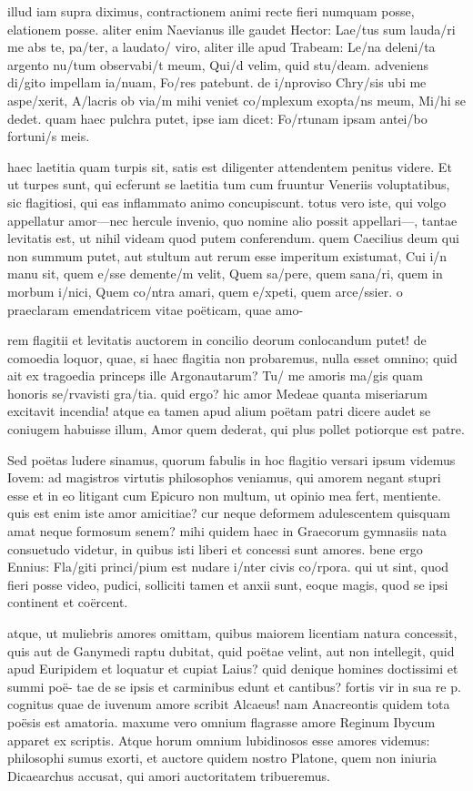  illud iam supra diximus, contractionem animi recte fieri numquam posse, elationem posse. aliter enim Naevianus ille gaudet Hector: Lae/tus sum lauda/ri me abs te, pa/ter, a laudato/ viro, aliter ille apud Trabeam: Le/na deleni/ta argento nu/tum observabi/t meum, Qui/d velim, quid stu/deam. adveniens di/gito impellam ia/nuam, Fo/res patebunt. de i/nproviso Chry/sis ubi me aspe/xerit, A/lacris ob via/m mihi veniet co/mplexum exopta/ns meum, Mi/hi se dedet. quam haec pulchra putet, ipse iam dicet: Fo/rtunam ipsam antei/bo fortuni/s meis.

 haec laetitia quam turpis sit, satis est diligenter attendentem penitus videre. Et ut turpes sunt, qui ecferunt se laetitia tum cum fruuntur Veneriis voluptatibus, sic flagitiosi, qui eas inflammato animo concupiscunt. totus vero iste, qui volgo appellatur amor—nec hercule invenio, quo nomine alio possit appellari—, tantae levitatis est, ut nihil videam quod putem conferendum. quem Caecilius deum qui non summum putet, aut stultum aut rerum esse imperitum existumat, Cui i/n manu sit, quem e/sse demente/m velit, Quem sa/pere, quem sana/ri, quem in morbum i/nici, Quem co/ntra amari, quem e/xpeti, quem arce/ssier. o praeclaram emendatricem vitae poëticam, quae amo-

 rem flagitii et levitatis auctorem in concilio deorum conlocandum putet! de comoedia loquor, quae, si haec flagitia non probaremus, nulla esset omnino; quid ait ex tragoedia princeps ille Argonautarum? Tu/ me amoris ma/gis quam honoris se/rvavisti gra/tia. quid ergo? hic amor Medeae quanta miseriarum excitavit incendia! atque ea tamen apud alium poëtam patri dicere audet se coniugem habuisse illum, Amor quem dederat, qui plus pollet potiorque est patre.

 Sed poëtas ludere sinamus, quorum fabulis in hoc flagitio versari ipsum videmus Iovem: ad magistros virtutis philosophos veniamus, qui amorem negant stupri esse et in eo litigant cum Epicuro non multum, ut opinio mea fert, mentiente. quis est enim iste amor amicitiae? cur neque deformem adulescentem quisquam amat neque formosum senem? mihi quidem haec in Graecorum gymnasiis nata consuetudo videtur, in quibus isti liberi et concessi sunt amores. bene ergo Ennius: Fla/giti princi/pium est nudare i/nter civis co/rpora. qui ut sint, quod fieri posse video, pudici, solliciti tamen et anxii sunt, eoque magis, quod se ipsi continent et coërcent.

 atque, ut muliebris amores omittam, quibus maiorem licentiam natura concessit, quis aut de Ganymedi raptu dubitat, quid poëtae velint, aut non intellegit, quid apud Euripidem et loquatur et cupiat Laius? quid denique homines doctissimi et summi poë- tae de se ipsis et carminibus edunt et cantibus? fortis vir in sua re p. cognitus quae de iuvenum amore scribit Alcaeus! nam Anacreontis quidem tota poësis est amatoria. maxume vero omnium flagrasse amore Reginum Ibycum apparet ex scriptis. Atque horum omnium lubidinosos esse amores videmus: philosophi sumus exorti, et auctore quidem nostro Platone, quem non iniuria Dicaearchus accusat, qui amori auctoritatem tribueremus.

